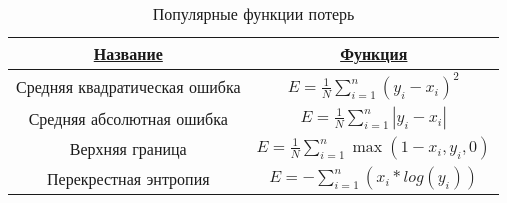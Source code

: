 
\begin{table}[H]
  \centering
  \caption{Популярные функции потерь} \label{loss_funcs}
  \begin{tabular}{|c|c|}
    \hline    
    \hyperlink{name}{Название} & \hyperlink{func}{Функция}\\
    \hline
    Средняя квадратическая ошибка & $E=\frac{1}{N}\displaystyle\sum\limits_{i=1}^{n}(y_i - x_i)^2$\\
    \hline
    Средняя абсолютная ошибка & $E=\frac{1}{N}\displaystyle\sum\limits_{i=1}^{n}|y_i - x_i|$ \\
    \hline
    Верхняя граница & $E=\frac{1}{N}\displaystyle\sum\limits_{i=1}^{n}\max(1-x_i, y_i, 0)$ \\
    \hline
    Перекрестная энтропия & $E=-\displaystyle\sum\limits_{i=1}^{n}(x_i*log(y_i))$ \\
    \hline
  \end{tabular}
\end{table}